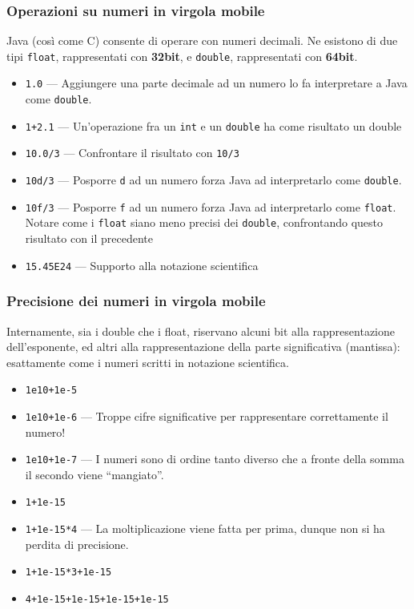 \documentclass{beamer}
\begin{document}
\begin{frame}
\frametitle{Operazioni su numeri in virgola mobile}
Java (così come C) consente di operare con numeri decimali. Ne esistono di due tipi \texttt{float}, rappresentati con \textbf{32bit}, e \texttt{double}, rappresentati con \textbf{64bit}.
\begin{itemize}
 \item \texttt{1.0} --- Aggiungere una parte decimale ad un numero lo fa interpretare a Java come \texttt{double}.
 \item \texttt{1+2.1} --- Un'operazione fra un \texttt{int} e un \texttt{double} ha come risultato un double
 \item \texttt{10.0/3} --- Confrontare il risultato con \texttt{10/3}
 \item \texttt{10d/3} --- Posporre \texttt{d} ad un numero forza Java ad interpretarlo come \texttt{double}.
 \item \texttt{10f/3} --- Posporre \texttt{f} ad un numero forza Java ad interpretarlo come \texttt{float}. Notare come i \texttt{float} siano meno precisi dei \texttt{double}, confrontando questo risultato con il precedente
 \item \texttt{15.45E24} --- Supporto alla notazione scientifica
\end{itemize}
\end{frame}

\begin{frame}
\frametitle{Precisione dei numeri in virgola mobile}
Internamente, sia i double che i float, riservano alcuni bit alla rappresentazione dell'esponente, ed altri alla rappresentazione della parte significativa (mantissa): esattamente come i numeri scritti in notazione scientifica.
\begin{itemize}
 \item \texttt{1e10+1e-5}
 \item \texttt{1e10+1e-6} --- Troppe cifre significative per rappresentare correttamente il numero!
 \item \texttt{1e10+1e-7} --- I numeri sono di ordine tanto diverso che a fronte della somma il secondo viene ``mangiato''.
 \item \texttt{1+1e-15}
 \item \texttt{1+1e-15*4} --- La moltiplicazione viene fatta per prima, dunque non si ha perdita di precisione.
 \item \texttt{1+1e-15*3+1e-15}
 \item \texttt{4+1e-15+1e-15+1e-15+1e-15} 
\end{itemize}
\end{frame}
\end{document}
